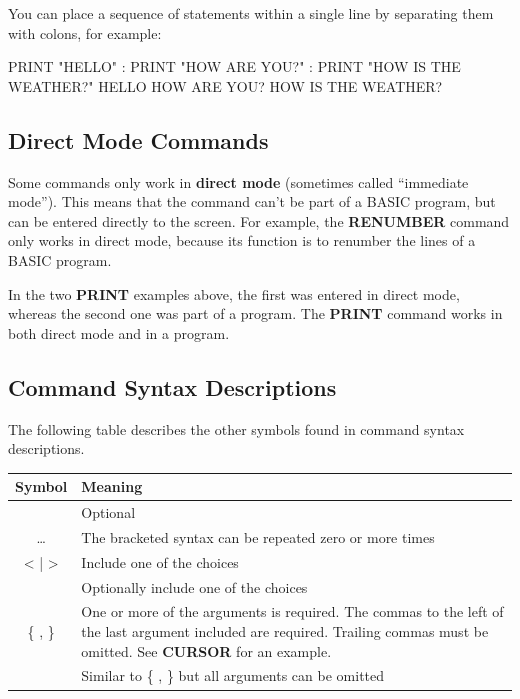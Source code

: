 You can place a sequence of statements within a single line by separating them with colons, for example:

\begin{screencode}
PRINT "HELLO" : PRINT "HOW ARE YOU?" : PRINT "HOW IS THE WEATHER?"
HELLO
HOW ARE YOU?
HOW IS THE WEATHER?
\end{screencode}

\subsection{Direct Mode Commands}
Some commands only work in {\bf direct mode} (sometimes called ``immediate mode''). This means that the command can't be part of a BASIC program, but can be entered directly to the screen. For example, the {\bf RENUMBER} command only works in direct mode, because its function is to renumber the lines of a BASIC program.

In the two {\bf PRINT} examples above, the first was entered in direct mode, whereas the second one was part of a program. The {\bf PRINT} command works in both direct mode and in a program.

\subsection{Command Syntax Descriptions}
The following table describes the other symbols found in command syntax descriptions.

\begin{center}
    \begin{longtable}{|c|L{8cm}|}
        \hline
        \textbf{Symbol} & \textbf{Meaning}\\
        \hline
        \endhead
        [ ] &
        Optional \\
        \hline
        \dots &
        The bracketed syntax can be repeated zero or more times \\
        \hline
        < | > &
        Include one of the choices \\
        \hline
        [ | ] &
        Optionally include one of the choices \\
        \hline
        \{ , \} &
        One or more of the arguments is required. The commas to the left of the last
        argument included are required. Trailing commas must be omitted. See
        {\bf CURSOR} for an example.\\
        \hline
        [\{ , \}] &
        Similar to \{ , \} but all arguments can be omitted\\
        \hline

    \end{longtable}
\end{center}

